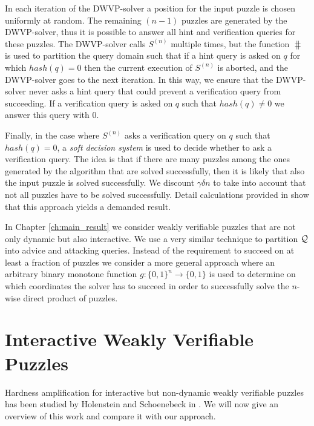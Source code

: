 In each iteration of the DWVP-solver a position for the input puzzle is chosen uniformly at random.
The remaining $(n-1)$ puzzles are generated by the DWVP-solver, thus it is possible to answer
all hint and verification queries for these puzzles.
The DWVP-solver calls $S^{(n)}$ multiple times, but the function $\hash$ is used
to partition the query domain such that
if a hint query is asked on $q$ for which $hash(q) = 0$ then the current execution of $S^{(n)}$
is aborted, and the DWVP-solver goes to the next iteration.
In this way, we ensure that the DWVP-solver never asks a hint query that could prevent a verification query from succeeding.
If a verification query is asked on $q$ such that $hash(q) \neq 0$ we answer this query with $0$.

Finally, in the case where $S^{(n)}$ asks a verification query on $q$ such that $hash(q) = 0$,
a \textit{soft decision system} is used to decide whether to ask a verification query.
The idea is that if there are many puzzles among the ones generated by the algorithm that are solved successfully,
then it is likely that also the input puzzle is solved successfully.
We discount $\gamma\delta n$ to take into account that not all puzzles have to be solved successfully.
Detail calculations provided in \cite{dodis2009security} show that this approach
yields a demanded result.

In Chapter \ref{ch:main_result} we consider weakly verifiable puzzles that are not only dynamic but also interactive.
We use a very similar technique to partition $\mathcal{Q}$ into advice and attacking queries.
Instead of the requirement to succeed on at least a fraction of puzzles we consider a more general approach where
an arbitrary binary monotone function $g : \{0,1\}^{n} \rightarrow \{0,1\}$ is used to
determine on which coordinates the solver has to succeed in order to successfully solve the $n$-wise direct product of puzzles.

\section{Interactive Weakly Verifiable Puzzles}
\label{section:iwvp}
Hardness amplification for interactive but non-dynamic weakly verifiable puzzles
has been studied by Holenstein and Schoenebeck in \cite{holenstein2011general}.
We will now give an overview of this work and compare it with our approach.

